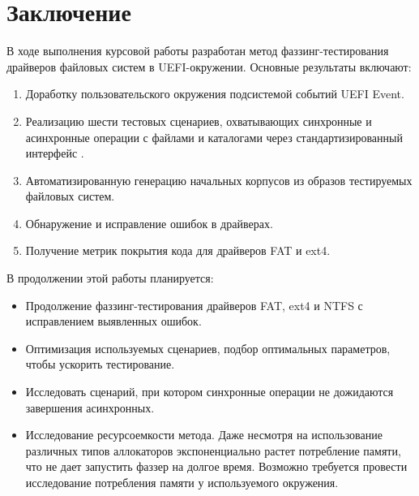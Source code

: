 \section{Заключение}
В ходе выполнения курсовой работы разработан метод фаззинг-тестирования драйверов файловых систем в UEFI-окружении. Основные результаты включают:
\begin{enumerate}
	\item Доработку пользовательского окружения подсистемой событий UEFI Event.
	\item Реализацию шести тестовых сценариев, охватывающих синхронные и асинхронные операции с файлами и каталогами через стандартизированный интерфейс .
	\item Автоматизированную генерацию начальных корпусов из образов тестируемых файловых систем.
	\item Обнаружение и исправление ошибок в драйверах.
	\item Получение метрик покрытия кода для драйверов FAT и ext4.
\end{enumerate}

В продолжении этой работы планируется:
\begin{itemize}
	\item Продолжение фаззинг-тестирования драйверов FAT, ext4 и NTFS с исправлением выявленных ошибок.
	\item Оптимизация используемых сценариев, подбор оптимальных параметров, чтобы ускорить тестирование.
	\item Исследовать сценарий, при котором синхронные операции не дожидаются завершения асинхронных.
	\item Исследование ресурсоемкости метода. Даже несмотря на использование различных типов аллокаторов экспоненциально растет потребление памяти, что не дает запустить фаззер на долгое время. Возможно требуется провести исследование потребления памяти у используемого окружения.
\end{itemize} 